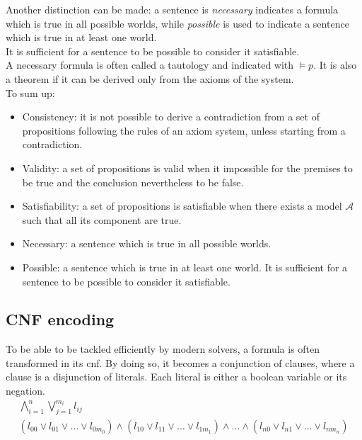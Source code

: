 Another distinction can be made: a sentence is \textit{necessary} indicates a formula which is true in all possible worlds, while \textit{possible} is used to indicate a sentence which is true in at least one world. \\
It is sufficient for a sentence to be possible to consider it satisfiable. \\
A necessary formula is often called a tautology and indicated with $\models p$.
It is also a theorem if it can be derived only from the axioms of the system. \\

To sum up:
\begin{itemize}
    \item Consistency: it is not possible to derive a contradiction from a set of propositions following the rules of an axiom system, unless starting from a contradiction.
    \item Validity: a set of propositions is valid when it impossible for the premises to be true and the conclusion nevertheless to be false.
    \item Satisfiability: a set of propositions is satisfiable when there exists a model $\mathcal{A}$ such that all its component are true.
    \item Necessary: a sentence which is true in all possible worlds.
    \item Possible: a sentence which is true in at least one world. It is sufficient for a sentence to be possible to consider it satisfiable.
\end{itemize}

\subsection*{CNF encoding}

To be able to be tackled efficiently by modern solvers, a formula is often transformed in its \gls{cnf}.
By doing so, it becomes a conjunction of clauses, where a clause is a disjunction of literals. Each literal is either a boolean variable or its negation. \\

\begin{gather*}
    \bigwedge_{i=1}^n \bigvee_{j=1}^{m_i} l_{ij} \\
    ( l_{00} \lor l_{01} \lor \dots \lor l_{0m_0}) \land (l_{10} \lor l_{11} \lor \dots \lor l_{1m_1}) \land \dots \land (l_{n0} \lor l_{n1} \lor \dots \lor l_{nm_n})
\end{gather*}

